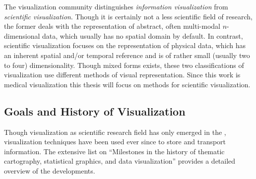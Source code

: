 The visualization community distinguishes \emph{information visualization} from \emph{scientific visualization}.
Though it is certainly not a less scientific field of research, the former deals with the representation of abstract, often multi-modal $n$-dimensional data, which usually has no spatial domain by default.
In contrast, scientific visualization focuses on the representation of physical data, which has an inherent spatial and/or temporal reference and is of rather small (usually two to four) dimensionality.
Though mixed forms exists, these two classifications of visualization use different methods of visual representation.
Since this work is  medical visualization this thesis will focus on methods for scientific visualization.


\subsection{Goals and History of Visualization}
Though visualization as scientific research field has only emerged in the , visualization techniques have been used ever since to store and transport information.
The extensive list on ``Milestones in the history of thematic cartography, statistical graphics, and data visualization'' \CN provides a detailed overview of the developments.

